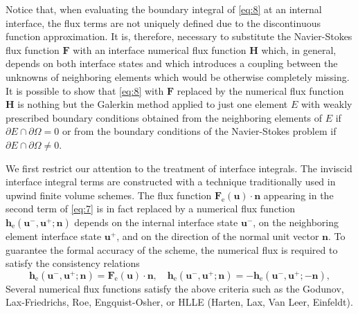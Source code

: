 \documentclass{develop-note}
\begin{document}
Notice that, when evaluating the boundary integral of \autoref{eq:8} at an internal interface, the flux terms are not uniquely defined due to the discontinuous function approximation. It is, therefore, necessary to substitute the Navier-Stokes flux function $\mathbf{F}$ with an interface numerical flux function $\mathbf{H}$ which, in general, depends on both interface states and which introduces a coupling between the unknowns of neighboring elements which would be otherwise completely missing. It is possible to show that \autoref{eq:8} with $\mathbf{F}$ replaced by the numerical flux function $\mathbf{H}$ is nothing but the Galerkin method applied to just one element $E$ with weakly prescribed boundary conditions obtained from the neighboring elements of $E$ if $\partial E\cap\partial\Omega =0$ or from the boundary conditions of the Navier-Stokes problem if $\partial E\cap\partial\Omega\neq 0$.

We first restrict our attention to the treatment of interface integrals. The inviscid interface integral terms are constructed with a technique traditionally used in upwind finite volume schemes. The flux function $\mathbf{F}_{\mathrm{e}}(\mathbf{u})\cdot\mathbf{n}$ appearing in the second term of \autoref{eq:7} is in fact replaced by a numerical flux function $\mathbf{h}_{\mathrm{e}}(\mathbf{u}^{-},\mathbf{u}^{+};\mathbf{n})$ depends on the internal interface state $\mathbf{u}^{-}$, on the neighboring element interface state $\mathbf{u}^{+}$, and on the direction of the normal unit vector $\mathbf{n}$. To guarantee the formal accuracy of the scheme, the numerical flux is required to satisfy the consistency relations
\begin{equation}
  \label{eq:9}
  \mathbf{h}_{\mathrm{e}}(\mathbf{u}^{-},\mathbf{u}^{+};\mathbf{n})=\mathbf{F}_{\mathrm{e}}(\mathbf{u})\cdot\mathbf{n},\quad\mathbf{h}_{\mathrm{e}}(\mathbf{u}^{-},\mathbf{u}^{+};\mathbf{n})=-\mathbf{h}_{\mathrm{e}}(\mathbf{u}^{-},\mathbf{u}^{+};-\mathbf{n}),
\end{equation}
Several numerical flux functions satisfy the above criteria such as the Godunov, Lax-Friedrichs, Roe, Engquist-Osher, or HLLE (Harten, Lax, Van Leer, Einfeldt).
\end{document}
